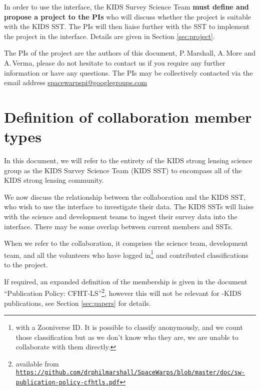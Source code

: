 \documentclass[a4paper,twocolumn]{article}
\begin{document}
In order to use the \SW interface, the KIDS Survey Science Team
\textbf{must define and propose a project to the \SW PIs} who will
discuss whether the project is suitable with the KIDS SST. The \SW PIs will
then liaise further with the SST to implement the project in the \SW
interface. Details are given in Section \ref{sec:project}.

\vspace{4mm} The PIs of the \SW project are the authors of this
document, P.\,Marshall, A.\,More and A.\,Verma, please do not hesitate
to contact us if you require any further information or have any
questions. The PIs may be collectively contacted via the email address
\href{mailto:spacewarpspi@googlegroups.com}{spacewarpspi@googlegroups.com}




\section{Definition of collaboration member types}
\label{sec:members}

In this document, we will refer to the entirety of the KIDS strong
lensing science group as the KIDS Survey Science Team (KIDS SST) to
encompass all of the KIDS strong lensing community.

We now discuss the relationship between the \SW collaboration and the
KIDS SST, who wish to use the \SW interface to investigate their
data. The KIDS SSTs will liaise with the \SW science and development
teams to ingest their survey data into the \SW interface. There may be
some overlap between current \SW members and SSTs. 

When we refer to the \SW collaboration, it comprises the \SW science
team, \SW development team, and all the volunteers who have logged
in\footnote{with a Zooniverse ID. It is possible to classify
  anonymously, and we count those classification but as we don't know
  who they are, we are unable to collaborate with them directly.} and
contributed classifications to the project.

If required, an expanded definition of the \SW membership is given in
the document ``\SW Publication Policy: CFHT-LS''\footnote{available
  from
  \texttt{\url{https://github.com/drphilmarshall/SpaceWarps/blob/master/doc/sw-publication-policy-cfhtls.pdf}}},
however this will not be relevant for \SW-KIDS publications, see
Section \ref{sec:papers} for details.
\end{document}

